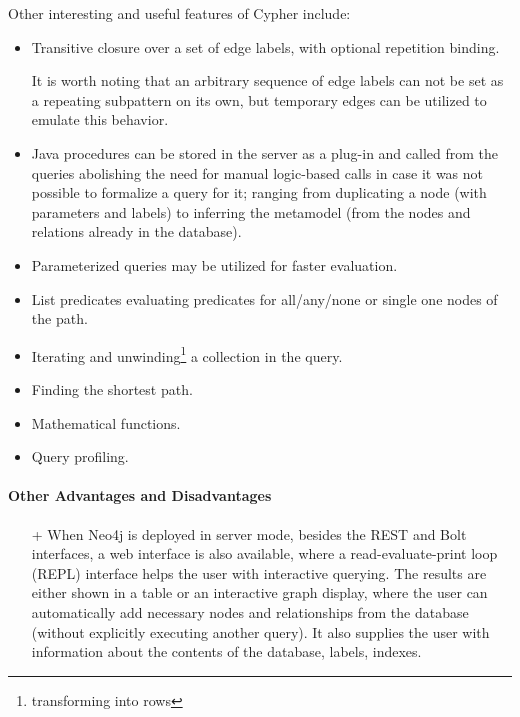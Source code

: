 Other interesting and useful features of Cypher include:
\begin{itemize}[topsep=0pt]
  \item Transitive closure over a set of edge labels, with optional repetition binding.

        It is worth noting that an arbitrary sequence of edge labels can not be set as a repeating subpattern on its own, but temporary edges can be utilized to emulate this behavior.
  \item Java procedures can be stored in the server as a plug-in and called from the queries abolishing the need for manual logic-based calls in case it was not possible to formalize a query for it; ranging from duplicating a node (with parameters and labels) to inferring the metamodel (from the nodes and relations already in the database).
  \item Parameterized queries may be utilized for faster evaluation.
  \item List predicates evaluating predicates for all/any/none or single one nodes of the path.
  \item Iterating and unwinding\footnote{transforming into rows} a collection in the query.
  \item Finding the shortest path.
  \item Mathematical functions.
  \item Query profiling.
\end{itemize}


\paragraph{Other Advantages and Disadvantages}
\begin{itemize}[topsep=0pt]
  \item[+] When Neo4j is deployed in server mode, besides the REST and Bolt interfaces, a web interface is also available, where a read-evaluate-print loop (REPL) interface helps the user with interactive querying. The results are either shown in a table or an interactive graph display, where the user can automatically add necessary nodes and relationships from the database (without explicitly executing another query). It also supplies the user with information about the contents of the database, labels, indexes.
\end{itemize}


